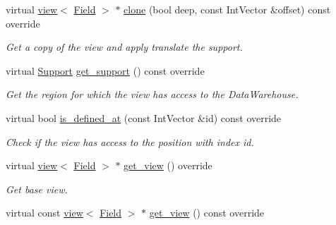 \begin{DoxyCompactItemize}
virtual \hyperlink{classUintah_1_1PhaseField_1_1detail_1_1view}{view}$<$ \hyperlink{structUintah_1_1PhaseField_1_1ScalarField}{Field} $>$ $\ast$ \hyperlink{classUintah_1_1PhaseField_1_1detail_1_1bcs__basic__fd__view_3_01ScalarField_3_01T_01_4_00_01STN_07caa9955adf783da0505eac75e76f08_abc781c41321336b5cc9e47157d133b2e}{clone} (bool deep, const Int\+Vector \&offset) const override
\begin{DoxyCompactList}\small\item\em Get a copy of the view and apply translate the support. \end{DoxyCompactList}\item 
virtual \hyperlink{classUintah_1_1PhaseField_1_1Support}{Support} \hyperlink{classUintah_1_1PhaseField_1_1detail_1_1bcs__basic__fd__view_3_01ScalarField_3_01T_01_4_00_01STN_07caa9955adf783da0505eac75e76f08_a64c502e452847bd6bbfa26e6584bd64b}{get\+\_\+support} () const override
\begin{DoxyCompactList}\small\item\em Get the region for which the view has access to the Data\+Warehouse. \end{DoxyCompactList}\item 
virtual bool \hyperlink{classUintah_1_1PhaseField_1_1detail_1_1bcs__basic__fd__view_3_01ScalarField_3_01T_01_4_00_01STN_07caa9955adf783da0505eac75e76f08_ad16a59586f836b9cb0d0110073418ad6}{is\+\_\+defined\+\_\+at} (const Int\+Vector \&id) const override
\begin{DoxyCompactList}\small\item\em Check if the view has access to the position with index id. \end{DoxyCompactList}\item 
virtual \hyperlink{classUintah_1_1PhaseField_1_1detail_1_1view}{view}$<$ \hyperlink{structUintah_1_1PhaseField_1_1ScalarField}{Field} $>$ $\ast$ \hyperlink{classUintah_1_1PhaseField_1_1detail_1_1bcs__basic__fd__view_3_01ScalarField_3_01T_01_4_00_01STN_07caa9955adf783da0505eac75e76f08_a1c51fe0d64605df5ce9c757681eb80a5}{get\+\_\+view} () override
\begin{DoxyCompactList}\small\item\em Get base view. \end{DoxyCompactList}\item 
virtual const \hyperlink{classUintah_1_1PhaseField_1_1detail_1_1view}{view}$<$ \hyperlink{structUintah_1_1PhaseField_1_1ScalarField}{Field} $>$ $\ast$ \hyperlink{classUintah_1_1PhaseField_1_1detail_1_1bcs__basic__fd__view_3_01ScalarField_3_01T_01_4_00_01STN_07caa9955adf783da0505eac75e76f08_a0aae05fb5f6751eddd0c5d5713512669}{get\+\_\+view} () const override

\end{DoxyCompactItemize}
